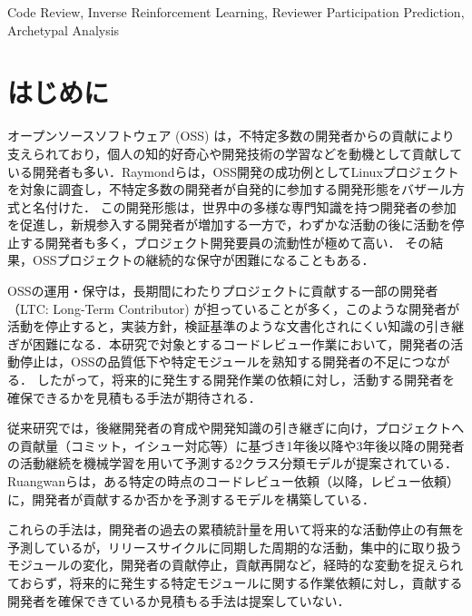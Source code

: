 \documentclass[submit]{ipsj}
\begin{document}
\begin{ekeyword}
Code Review, Inverse Reinforcement Learning, Reviewer Participation Prediction, Archetypal Analysis
\end{ekeyword}

\maketitle

\section{はじめに}
オープンソースソフトウェア (OSS) は，不特定多数の開発者からの貢献により支えられており，個人の知的好奇心や開発技術の学習などを動機として貢献している開発者も多い\cite{motivation}．Raymondらは，OSS開発の成功例としてLinuxプロジェクトを対象に調査し，不特定多数の開発者が自発的に参加する開発形態をバザール方式と名付けた\cite{bazzar}．
この開発形態は，世界中の多様な専門知識を持つ開発者の参加を促進し，新規参入する開発者が増加する一方で，わずかな活動の後に活動を停止する開発者も多く，プロジェクト開発要員の流動性が極めて高い\cite{dynamics}．
その結果，OSSプロジェクトの継続的な保守が困難になることもある\cite{pinto_otc}．

OSSの運用・保守は，長期間にわたりプロジェクトに貢献する一部の開発者（LTC: Long-Term Contributor) が担っていることが多く，このような開発者が活動を停止すると，実装方針，検証基準のような文書化されにくい知識の引き継ぎが困難になる．本研究で対象とするコードレビュー作業において，開発者の活動停止は，OSSの品質低下や特定モジュールを熟知する開発者の不足につながる\cite{bacchelli}\cite{mcintosh}．
したがって，将来的に発生する開発作業の依頼に対し，活動する開発者を確保できるかを見積もる手法が期待される．


従来研究では，後継開発者の育成や開発知識の引き継ぎに向け，プロジェクトへの貢献量（コミット，イシュー対応等）に基づき1年後以降や3年後以降の開発者の活動継続を機械学習を用いて予測する2クラス分類モデルが提案されている\cite{zhou}\cite{bao}\cite{constantinou}．Ruangwanらは，ある特定の時点のコードレビュー依頼（以降，レビュー依頼）に，開発者が貢献するか否かを予測するモデルを構築している\cite{shade}．

これらの手法は，開発者の過去の累積統計量を用いて将来的な活動停止の有無を予測しているが，リリースサイクルに同期した周期的な活動，集中的に取り扱うモジュールの変化，開発者の貢献停止，貢献再開など，経時的な変動を捉えられておらず，将来的に発生する特定モジュールに関する作業依頼に対し，貢献する開発者を確保できているか見積もる手法は提案していない．
\end{document}
